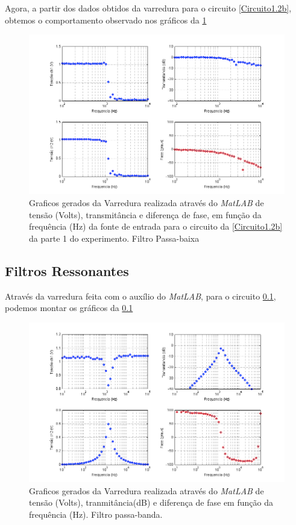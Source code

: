 \documentclass[11pt,a4paper]{article}
\begin{document}
Agora, a partir dos dados obtidos da varredura para o circuito \cref{Circuito1.2b}, obtemos o comportamento observado nos gráficos da \cref{Varredura2B}\\
\newpage
    \begin{figure}[!htb]
    \centering
    \includegraphics[scale=0.8]{Varredura2B.png}
    \caption{Graficos gerados da Varredura realizada através do \textit{MatLAB} de tensão (Volts), transmitância e diferença de fase, em função da frequência (Hz) da fonte de entrada para o circuito da \cref{Circuito1.2b} da parte 1 do experimento. Filtro Passa-baixa}
    \label{Varredura2B}
    \end{figure}

\subsection{Filtros Ressonantes}

Através da varredura feita com o auxílio do \textit{MatLAB}, para o circuito \cref{}, podemos montar os gráficos da \cref{}

    \begin{figure}[!htb]
    \centering
    \includegraphics[scale=0.8]{Varredura2AParte2.png}
    \caption{Graficos gerados da Varredura realizada através do \textit{MatLAB} de tensão (Volts), tranmitância(dB) e diferença de fase em função da frequência (Hz). Filtro passa-banda.}
    \label{Varredura2AParte2}
    \end{figure}
    
\end{document}
